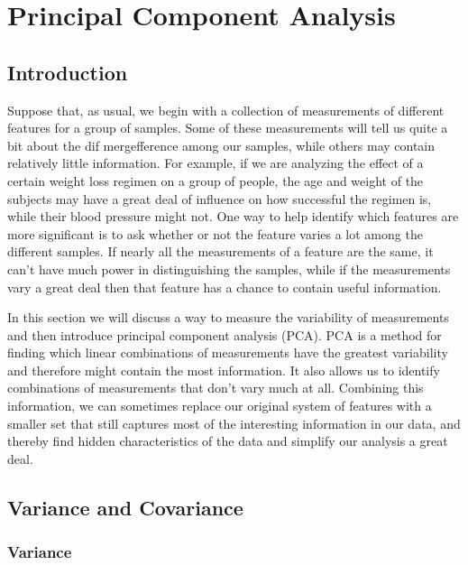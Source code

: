 \documentclass[
  11pt,
  letterpaper,
]{scrbook}
\theoremstyle{plain}
\theoremstyle{plain}
\theoremstyle{remark}
\begin{document}

\hypertarget{principal-component-analysis}{%
\chapter{Principal Component
Analysis}\label{principal-component-analysis}}

\hypertarget{introduction}{%
\section{Introduction}\label{introduction}}

Suppose that, as usual, we begin with a collection of measurements of
different features for a group of samples. Some of these measurements
will tell us quite a bit about the dif mergefference among our samples,
while others may contain relatively little information. For example, if
we are analyzing the effect of a certain weight loss regimen on a group
of people, the age and weight of the subjects may have a great deal of
influence on how successful the regimen is, while their blood pressure
might not. One way to help identify which features are more significant
is to ask whether or not the feature varies a lot among the different
samples. If nearly all the measurements of a feature are the same, it
can't have much power in distinguishing the samples, while if the
measurements vary a great deal then that feature has a chance to contain
useful information.

In this section we will discuss a way to measure the variability of
measurements and then introduce principal component analysis (PCA). PCA
is a method for finding which linear combinations of measurements have
the greatest variability and therefore might contain the most
information. It also allows us to identify combinations of measurements
that don't vary much at all. Combining this information, we can
sometimes replace our original system of features with a smaller set
that still captures most of the interesting information in our data, and
thereby find hidden characteristics of the data and simplify our
analysis a great deal.

\hypertarget{variance-and-covariance}{%
\section{Variance and Covariance}\label{variance-and-covariance}}

\hypertarget{variance}{%
\subsection{Variance}\label{variance}}
\end{document}
